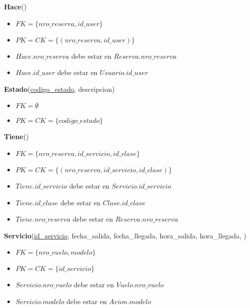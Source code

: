 \vspace*{0.1cm}
\noindent
\textbf{Hace}(\underline{})
\begin{itemize}[noitemsep]
	\item $FK = \{nro\_reserva, id\_user\}$
	\item $PK = CK = \{(nro\_reserva, id\_user)\}$
	\item $Hace.nro\_reserva$ debe estar en $Reserva.nro\_reserva$
	\item $Hace.id\_user$ debe estar en $Usuario.id\_user$
\end{itemize}

\vspace*{0.1cm}
\noindent
\textbf{Estado}(\underline{codigo\_estado}, descripcion)
\begin{itemize}[noitemsep]
	\item $FK = \emptyset$
	\item $PK = CK = \{codigo\_estado\}$
\end{itemize}

\vspace*{0.1cm}
\noindent
\textbf{Tiene}(\underline{})
\begin{itemize}[noitemsep]
	\item $FK = \{nro\_reserva, id\_servicio, id\_clase\}$
	\item $PK = CK = \{(nro\_reserva, id\_servicio, id\_clase)\}$
	\item $Tiene.id\_servicio$ debe estar en $Servicio.id\_servicio$
	\item $Tiene.id\_clase$ debe estar en $Clase.id\_clase$
	\item $Tiene.nro\_reserva$ debe estar en $Reserva.nro\_reserva$
\end{itemize}

\vspace*{0.1cm}
\noindent
\textbf{Servicio}(\underline{id\_servicio}, fecha\_salida, fecha\_llegada,
		hora\_salida, hora\_llegada, )
\begin{itemize}[noitemsep]
	\item $FK = \{nro\_vuelo, modelo\}$
	\item $PK = CK = \{id\_servicio\}$
	\item $Servicio.nro\_vuelo$ debe estar en $Vuelo.nro\_vuelo$
	\item $Servicio.modelo$ debe estar en $Avion.modelo$
\end{itemize}

